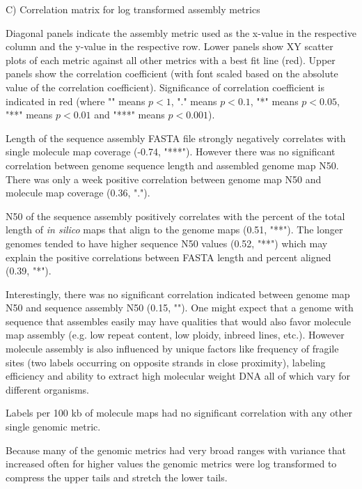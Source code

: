 C) Correlation matrix for log transformed assembly metrics

Diagonal panels indicate the assembly metric used as the x-value in the respective column and the y-value in the respective row. Lower panels show XY scatter plots of each metric against all other metrics with a best fit line (red). Upper panels show the correlation coefficient (with font scaled based on the absolute value of the correlation coefficient). Significance of correlation coefficient is indicated in red (where "" means $p< 1$, "." means $p< 0.1$, "*" means $p< 0.05$, "**" means $p< 0.01$ and "***" means $p< 0.001$).

Length of the sequence assembly FASTA file strongly negatively correlates with single molecule map coverage (-0.74, "***"). However there was no significant correlation between genome sequence length and assembled genome map N50. There was only a week positive correlation between genome map N50 and molecule map coverage (0.36, "."). 

N50 of the sequence assembly positively correlates with the percent of the total length of \textit{in silico} maps that align to the genome maps (0.51, "**"). The longer genomes tended to have higher sequence N50 values (0.52, "**") which may explain the positive correlations between FASTA length and percent aligned (0.39, "*").

Interestingly, there was no significant correlation indicated between genome map N50 and sequence assembly N50 (0.15, ""). One might expect that a genome with sequence that assembles easily may have qualities that would also favor molecule map assembly (e.g. low repeat content, low ploidy, inbreed lines, etc.). However molecule assembly is also influenced by unique factors like frequency of fragile sites (two labels occurring on opposite strands in close proximity), labeling efficiency and ability to extract high molecular weight DNA all of which vary for different organisms.

Labels per 100 kb of molecule maps had no significant correlation with any other single genomic metric.

Because many of the genomic metrics had very broad ranges with variance that increased often for higher values the genomic metrics were log transformed to compress the upper tails and stretch the lower tails.

